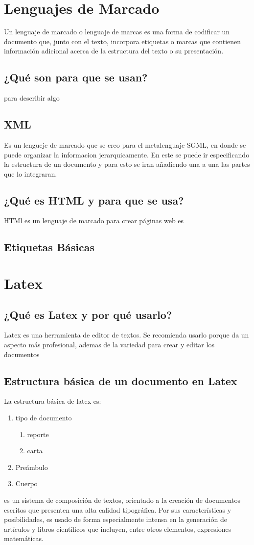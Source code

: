 \documentclass[11pt,letterpaper]{article}
\begin{document}
\section{Lenguajes de Marcado}
Un lenguaje de marcado o lenguaje de marcas es una forma de codificar un documento que, junto con el texto, incorpora etiquetas o marcas que contienen información adicional acerca de la estructura del texto o su presentación.


\subsection{¿Qué son para que se usan?}
para describir algo 

\subsection{XML}
Es un lengueje de marcado que se creo para el metalenguaje SGML, en donde se puede organizar la informacion jerarquicamente.
En este se puede ir especificando la estructura de un documento y para esto se iran añadiendo una a una las partes que lo integraran.
\subsection{¿Qué es HTML y para que se usa?}
HTMl es un lenguaje de marcado para crear páginas web
es\subsection{Etiquetas Básicas}

\section{Latex}
\subsection{¿Qué es Latex y por qué usarlo?}
Latex es una herramienta de editor de textos. Se recomienda usarlo porque da un aspecto más profesional, ademas de la variedad para crear y editar los documentos
\subsection{Estructura básica de un documento en Latex}
La estructura básica de latex es:
\begin{enumerate}
\item tipo de documento
  \begin{enumerate}
  \item reporte
  \item carta
  \end{enumerate}
\item Preámbulo
\item Cuerpo
\end{enumerate}
es un sistema de composición de textos, orientado a la creación de documentos escritos que presenten una alta calidad tipográfica. Por sus características y posibilidades, es usado de forma especialmente intensa en la generación de artículos y libros científicos que incluyen, entre otros elementos, expresiones matemáticas.
\end{document}
